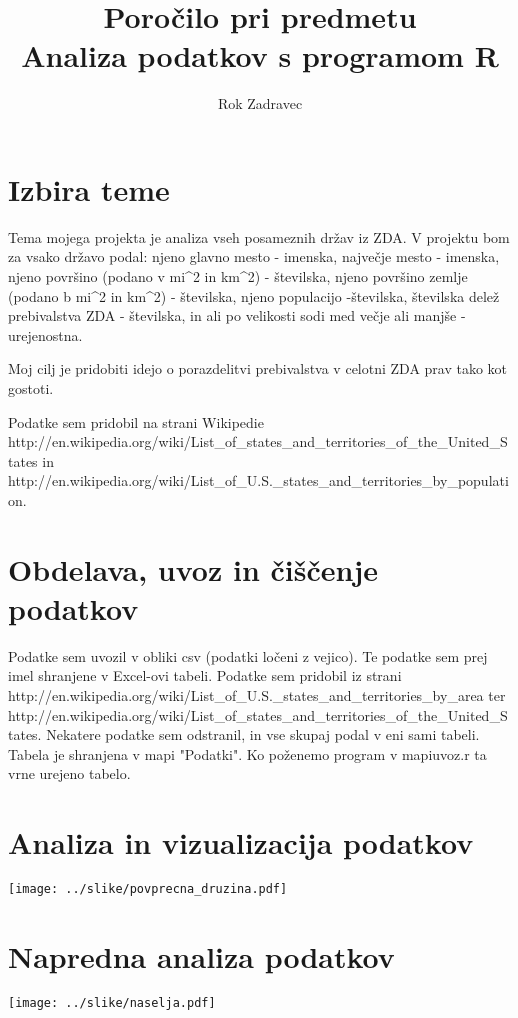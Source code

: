 \documentclass[11pt,a4paper]{article}
\begin{document}
\title{Poročilo pri predmetu \\
Analiza podatkov s programom R}
\author{Rok Zadravec}
\maketitle

\section{Izbira teme}

Tema mojega projekta je analiza vseh posameznih držav iz ZDA. V projektu bom za vsako državo podal: njeno glavno mesto - imenska, največje mesto - imenska, njeno površino (podano v mi^2 in km^2) - številska, njeno površino zemlje (podano b mi^2 in km^2) - številska, njeno populacijo -številska, številska delež prebivalstva ZDA  - številska, in ali po velikosti sodi med večje ali manjše - urejenostna.

Moj cilj je pridobiti idejo o porazdelitvi prebivalstva v celotni ZDA prav tako kot gostoti.

Podatke sem pridobil na strani Wikipedie http://en.wikipedia.org/wiki/List_of_states_and_territories_of_the_United_States in 
http://en.wikipedia.org/wiki/List_of_U.S._states_and_territories_by_population.


\section{Obdelava, uvoz in čiščenje podatkov}

Podatke sem uvozil v obliki csv (podatki ločeni z vejico). Te podatke sem prej imel shranjene v Excel-ovi tabeli. Podatke sem 
pridobil iz strani http://en.wikipedia.org/wiki/List_of_U.S._states_and_territories_by_area ter 
http://en.wikipedia.org/wiki/List_of_states_and_territories_of_the_United_States. Nekatere podatke sem odstranil, 
in vse skupaj podal v eni sami tabeli. Tabela je shranjena v mapi "Podatki".
Ko poženemo program v mapiuvoz.r ta vrne urejeno tabelo.

\section{Analiza in vizualizacija podatkov}

\texttt{[image: ../slike/povprecna\_druzina.pdf]}

\section{Napredna analiza podatkov}

\texttt{[image: ../slike/naselja.pdf]}
\end{document}
